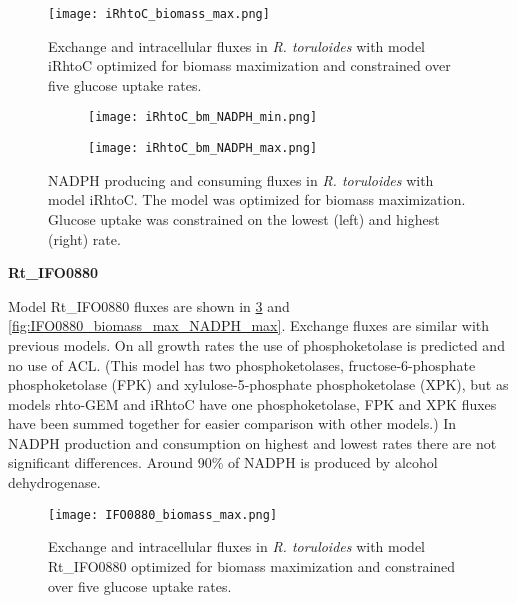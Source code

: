 \begin{figure}[h!]
    \centering
    \texttt{[image: iRhtoC\_biomass\_max.png]}
    \caption{Exchange and intracellular fluxes in \textit{R. toruloides} with model iRhtoC optimized for biomass maximization 
    and constrained over five glucose uptake rates.}
    \label{iRhtoC_biomass_max}
\end{figure}

\begin{figure}[h!]
    \centering
    \begin{subfigure}[h!]{0.49\textwidth}
        \centering
        \texttt{[image: iRhtoC\_bm\_NADPH\_min.png]}
    \end{subfigure}
    \hfill
    \begin{subfigure}[h!]{0.49\textwidth}
        \centering
        \texttt{[image: iRhtoC\_bm\_NADPH\_max.png]}
    \end{subfigure}
    \caption{NADPH producing and consuming fluxes in \textit{R. toruloides} with model iRhtoC. The model was optimized for biomass maximization. 
    Glucose uptake was constrained on the lowest (left) and highest (right) rate.}
    \label{fig:iRhtoC_bm_NADPH}
\end{figure}


\textbf{Rt\_IFO0880}

Model Rt\_IFO0880 fluxes are shown in \ref{fig:IFO0880_biomass_max} and \ref{fig:IFO0880_biomass_max_NADPH_max}.
Exchange fluxes are similar with previous models. On all growth rates the use of phosphoketolase is predicted and no use of ACL. 
(This model has two phosphoketolases, fructose-6-phosphate phosphoketolase (FPK) and xylulose-5-phosphate phosphoketolase (XPK), but as models rhto-GEM and iRhtoC
have one phosphoketolase, FPK and XPK fluxes have been summed together for easier comparison with other models.)
In NADPH production and consumption on highest and lowest rates there are not significant differences. 
Around 90\% of NADPH is produced by alcohol dehydrogenase. %



\begin{figure}[h!]
    \centering
    \texttt{[image: IFO0880\_biomass\_max.png]}
    \caption{Exchange and intracellular fluxes in \textit{R. toruloides} with model Rt\_IFO0880 optimized for biomass maximization 
    and constrained over five glucose uptake rates.}
    \label{fig:IFO0880_biomass_max}
\end{figure}

